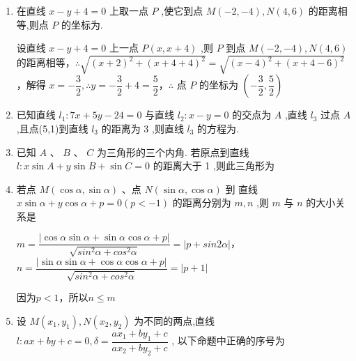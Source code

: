 \begin{enumerate}
    \item 在直线 ${x} - {y} + 4 = 0$ 上取一点 ${P}$ ,使它到点 ${M}\left( {-2, - 4}\right) ,{N}\left( {4,6}\right)$ 的距离相等,则点 ${P}$ 的坐标为.
    \begin{jieda}
        设直线 $x - y + 4 = 0$ 上一点 $P\left( {x,x + 4}\right)$ ,则 $P$ 到点 $M\left( {-2, - 4}\right) ,N\left( {4,6}\right)$ 的距离相等，$\therefore \sqrt{{\left( x + 2\right) }^{2} + {\left( x + 4 + 4\right) }^{2}} = \sqrt{{\left( x - 4\right) }^{2} + {\left( x + 4 - 6\right) }^{2}}$，解得 $x =  - \dfrac{3}{2},\therefore y =  - \dfrac{3}{2} + 4 = \dfrac{5}{2}$，$\therefore$ 点 $P$ 的坐标为 $\left( {-\dfrac{3}{2},\dfrac{5}{2}}\right)$
    \end{jieda}
    
    \item 已知直线 ${l}_{1} : {7x} + {5y} - {24} = 0$ 与直线 ${l}_{2} : x - y = 0$ 的交点为 $A$ ,直线 ${l}_{3}$ 过点 $A$ ,且点(5,1)到直线 ${l}_{3}$ 的距离为 3 ,则直线 ${l}_{3}$ 的方程为.
    
    \item 已知 $A\text{ 、 }B\text{ 、 }C$ 为三角形的三个内角. 若原点到直线 $l : x\sin A + y\sin B + \sin C = 0$ 的距离大于 1 ,则此三角形为
    
    \item 若点 $M\left( {\cos \alpha,\sin \alpha}\right)$ 、点 $N\left( {\sin \alpha,\cos \alpha}\right)$ 到 直线$x\sin \alpha  + y\cos \alpha  + p = 0\left( {p <  - 1}\right)$ 的距离分别为 $m,n$ ,则 $m$ 与 $n$ 的大小关系是
    \begin{jieda}
        $m=\dfrac{|\cos \alpha\sin \alpha  + \sin \alpha \cos \alpha  + p|}{\sqrt{sin^2\alpha + cos^2\alpha}} = |p+sin2\alpha|$，$n=\dfrac{|\sin \alpha \sin \alpha  + \cos \alpha\cos \alpha  + p|}{\sqrt{sin^2\alpha + cos^2\alpha}} = |p+1|$

        因为$p < 1$，所以$n \leq m$
    \end{jieda}
    
    \item 设 $M\left( {{x}_{1},{y}_{1}}\right) ,N\left( {{x}_{2},{y}_{2}}\right)$ 为不同的两点,直线 $l : {ax} + {by} + c = 0,\delta  = \dfrac{a{x}_{1} + b{y}_{1} + c}{a{x}_{2} + b{y}_{2} + c}$ , 以下命题中正确的序号为


\end{enumerate}
